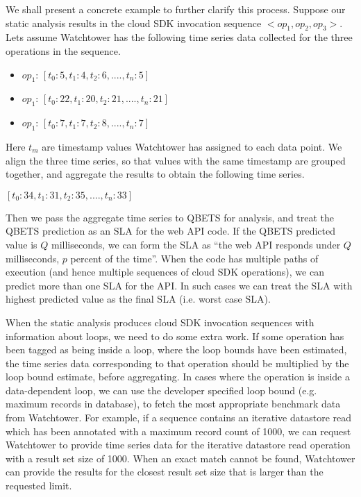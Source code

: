 We shall present a concrete example to further clarify this process. Suppose our static analysis results in the
cloud SDK invocation sequence $<op_{1},op_{2},op_{3}>$. Lets assume Watchtower has the following
time series data collected for the three operations in the sequence.

\begin{itemize}
\item $op_{1}$: $[t_{0}: 5, t_{1}: 4, t_{2}: 6, ...., t_{n}: 5]$
\item $op_{1}$: $[t_{0}: 22, t_{1}: 20, t_{2}: 21, ...., t_{n}: 21]$
\item $op_{1}$: $[t_{0}: 7, t_{1}: 7, t_{2}: 8, ...., t_{n}: 7]$
\end{itemize}

Here $t_{m}$ are timestamp values Watchtower has assigned to each data point. We align the three
time series, so that values with the same timestamp are grouped together, and aggregate the results
to obtain the following time series.

$[t_{0}: 34, t_{1}: 31, t_{2}: 35, ...., t_{n}: 33]$

Then we pass the aggregate time series to QBETS for analysis, and
treat the QBETS prediction as an SLA for the web API code.
If the QBETS predicted value is $Q$ milliseconds, we can form the SLA as ``the web API responds 
under $Q$ milliseconds, $p$ percent of the time''. When the code has multiple paths of execution (and
hence multiple sequences of cloud SDK operations), we can predict more than one SLA for the API. In
such cases we can treat the SLA with highest predicted value as the final SLA (i.e. worst case SLA).

When the static analysis produces cloud SDK invocation sequences with information about loops, we 
need to do some extra work. If some operation has been tagged as being inside a loop, where the loop
bounds have been estimated, the time series data corresponding to that operation should be multiplied 
by the loop bound estimate, before aggregating. In cases where the operation is inside a data-dependent
loop, we can use the developer specified loop bound (e.g. maximum records
in database), to fetch the most appropriate benchmark data from Watchtower.
For example, if a sequence contains an iterative datastore read which has been annotated with a maximum
record count of 1000, we can request Watchtower to provide time series data for the iterative datastore
read operation with a result set size of 1000. When an exact match cannot be found, Watchtower can
provide the results for the closest result set size that is larger than the requested limit.

